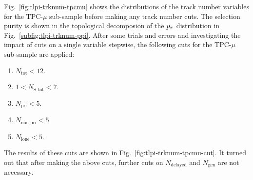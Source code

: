 Fig.~\ref{fig:tlpi-trknum-tpcmu} shows the distributions of the track number variables for the TPC-$\mu$ sub-sample before making any track number cuts.
The selection purity is shown in the topological decomposion of the $p_{\pi}$ distribution in Fig.~\ref{subfig:tlpi-trknum-ppi}.
After some trials and errors and investigating the impact of cuts on a single variable stepwise, the following cuts for the TPC-$\mu$ sub-sample are applied:
\begin{enumerate}
    \item $N_{\textrm{tot}}<12$.
    \item $1<N_{\textrm{S-tot}}<7$.
    \item $N_{\textrm{pri}}<5$.
    \item $N_{\textrm{non-pri}}<5$.
    \item $N_{\textrm{lone}}<5$.
\end{enumerate}
The results of these cuts are shown in Fig.~\ref{fig:tlpi-trknum-tpcmu-cut}.
It turned out that after making the above cuts, further cuts on $N_{\textrm{delayed}}$ and $N_{\textrm{gen}}$ are not necessary.
